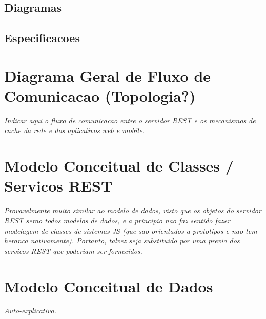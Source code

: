 \documentclass[a4paper]{abnt}
\begin{document}
\subsection{Diagramas}

\subsection{Especificacoes}

\section{Diagrama Geral de Fluxo de Comunicacao (Topologia?)}
\emph{Indicar aqui o fluxo de comunicacao entre o servidor REST e os mecanismos de cache da rede e dos aplicativos web e mobile.}

\section{Modelo Conceitual de Classes / Servicos REST}
\emph{Provavelmente muito similar ao modelo de dados, visto que os objetos do servidor REST serao todos modelos de dados, e a principio nao faz sentido fazer modelagem de classes de sistemas JS (que sao orientados a prototipos e nao tem heranca nativamente). Portanto, talvez seja substituido por uma previa dos servicos REST que poderiam ser fornecidos.}

\section{Modelo Conceitual de Dados}
\emph{Auto-explicativo.}

\printbibliography
\end{document}
